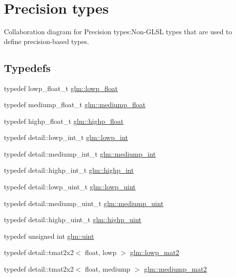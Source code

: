 \hypertarget{group__core__precision}{
\section{Precision types}
\label{group__core__precision}
}


Collaboration diagram for Precision types:Non-GLSL types that are used to define precision-based types.  
\subsection*{Typedefs}
\begin{CompactItemize}
\item 
typedef lowp\_\-float\_\-t \hyperlink{group__core__precision_g2887fbc729ac5c1c5caeb7cd57a7145c}{glm::lowp\_\-float}
\item 
typedef mediump\_\-float\_\-t \hyperlink{group__core__precision_gc785826c039fe6c97c03b37c81c1a68e}{glm::mediump\_\-float}
\item 
typedef highp\_\-float\_\-t \hyperlink{group__core__precision_g3d443a093adc053638ed7f81c5bfe300}{glm::highp\_\-float}
\item 
typedef detail::lowp\_\-int\_\-t \hyperlink{group__core__precision_g4681244bf4a184734f03aa9df4e3d288}{glm::lowp\_\-int}
\item 
typedef detail::mediump\_\-int\_\-t \hyperlink{group__core__precision_g2a3dcbcd7f4e17663d393a12061ac6ac}{glm::mediump\_\-int}
\item 
typedef detail::highp\_\-int\_\-t \hyperlink{group__core__precision_gafed5240eb0a43328cb75faf5fb0a8c2}{glm::highp\_\-int}
\item 
typedef detail::lowp\_\-uint\_\-t \hyperlink{group__core__precision_g8077c90f2c87e419ea6c273157dcc1fc}{glm::lowp\_\-uint}
\item 
typedef detail::mediump\_\-uint\_\-t \hyperlink{group__core__precision_g08ae38ad78ade3539fdd1d25052b8c51}{glm::mediump\_\-uint}
\item 
typedef detail::highp\_\-uint\_\-t \hyperlink{group__core__precision_gbfd1cf11193324a5f77d3831b6ac3205}{glm::highp\_\-uint}
\item 
typedef unsigned int \hyperlink{group__core__precision_g4fd29415871152bfb5abd588334147c8}{glm::uint}
\item 
typedef detail::tmat2x2$<$ float, lowp $>$ \hyperlink{group__core__precision_gc0acc3ccf8da050af3393ea639f698d6}{glm::lowp\_\-mat2}
\item 
typedef detail::tmat2x2$<$ float, mediump $>$ \hyperlink{group__core__precision_g6ed8bfa67b72cea216cb558411f95f86}{glm::mediump\_\-mat2}

\end{CompactItemize}
